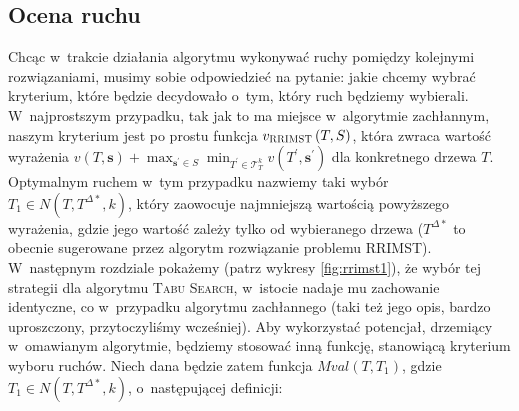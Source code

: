 \subsection{Ocena ruchu}

Chcąc w~trakcie działania algorytmu wykonywać ruchy pomiędzy kolejnymi rozwiązaniami, musimy sobie odpowiedzieć na pytanie: jakie chcemy wybrać kryterium, które będzie decydowało o~tym, który ruch będziemy wybierali. W~najprostszym przypadku, tak jak to ma miejsce w~algorytmie zachłannym, naszym kryterium jest po prostu funkcja $v_{\textsc{RRIMST}} \left( T, S \right)$, która zwraca wartość wyrażenia $v \left( T, \textbf{s} \right) + \max_{\textbf{s}^{\prime} \in S} \min_{T^{\prime} \in \mathcal{T}^{k}_{T}} v \left( T^{\prime}, \textbf{s}^{\prime} \right)$ dla konkretnego drzewa $T$. Optymalnym ruchem w~tym przypadku nazwiemy taki wybór $T_{1} \in N \left( T, T^{\Delta\ast}, k \right)$, który zaowocuje najmniejszą wartością powyższego wyrażenia, gdzie jego wartość zależy tylko od wybieranego drzewa ($T^{\Delta\ast}$ to obecnie sugerowane przez algorytm rozwiązanie problemu \textsc{RRIMST}). W~następnym rozdziale pokażemy (patrz wykresy \ref{fig:rrimst1}), że wybór tej strategii dla algorytmu \textsc{Tabu Search}, w~istocie nadaje mu zachowanie identyczne, co w~przypadku algorytmu zachłannego (taki też jego opis, bardzo uproszczony, przytoczyliśmy wcześniej). Aby wykorzystać potencjał, drzemiący w~omawianym algorytmie, będziemy stosować inną funkcję, stanowiącą kryterium wyboru ruchów. Niech dana będzie zatem funkcja $Mval \left( T, T_{1} \right)$, gdzie $T_{1} \in N \left( T, T^{\Delta\ast}, k \right)$, o~następującej definicji:

